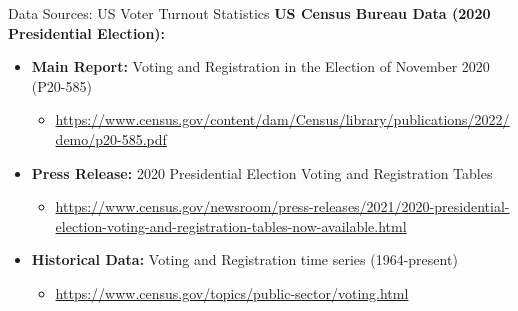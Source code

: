 \documentclass[10pt]{beamer}
\begin{document}
\begin{frame}{Data Sources: US Voter Turnout Statistics}
\textbf{US Census Bureau Data (2020 Presidential Election):}



\small
\begin{itemize}
\item \textbf{Main Report:} Voting and Registration in the Election of November 2020 (P20-585)
\begin{itemize}
\footnotesize
\item \url{https://www.census.gov/content/dam/Census/library/publications/2022/demo/p20-585.pdf}
\end{itemize}



\item \textbf{Press Release:} 2020 Presidential Election Voting and Registration Tables
\begin{itemize}
\footnotesize
\item \url{https://www.census.gov/newsroom/press-releases/2021/2020-presidential-election-voting-and-registration-tables-now-available.html}
\end{itemize}



\item \textbf{Historical Data:} Voting and Registration time series (1964-present)
\begin{itemize}
\footnotesize
\item \url{https://www.census.gov/topics/public-sector/voting.html}
\end{itemize}
\end{itemize}
\end{frame}
\end{document}
